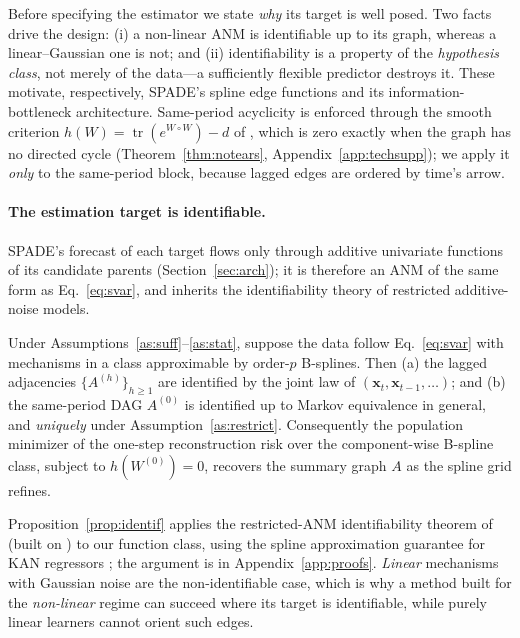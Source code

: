 Before specifying the estimator we state \emph{why} its target is well posed.
Two facts drive the design: (i) a non-linear ANM is identifiable up to its
graph, whereas a linear--Gaussian one is not; and (ii) identifiability is a
property of the \emph{hypothesis class}, not merely of the data---a
sufficiently flexible predictor destroys it. These motivate, respectively,
SPADE's spline edge functions and its information-bottleneck architecture. Same-period
acyclicity is enforced through the smooth criterion
$h(W)=\operatorname{tr}(e^{W\circ W})-d$ of \citet{Zheng2018}, which is zero exactly
when the graph has no directed cycle (Theorem~\ref{thm:notears},
Appendix~\ref{app:techsupp}); we apply it \emph{only} to the same-period block,
because lagged edges are ordered by time's arrow.

\paragraph{The estimation target is identifiable.} SPADE's forecast of each
target flows only through additive univariate functions of its candidate parents
(Section~\ref{sec:arch}); it is therefore an ANM of the same form as
Eq.~\eqref{eq:svar}, and inherits the identifiability theory of restricted
additive-noise models.
\begin{proposition}\label{prop:identif}
Under Assumptions~\ref{as:suff}--\ref{as:stat}, suppose the data follow
Eq.~\eqref{eq:svar} with mechanisms in a class approximable by order-$p$
B-splines. Then (a) the lagged adjacencies $\{A^{(h)}\}_{h\ge 1}$ are identified
by the joint law of $(\mathbf{x}_t,\mathbf{x}_{t-1},\dots)$; and (b) the
same-period DAG $A^{(0)}$ is identified up to Markov equivalence in general,
and \emph{uniquely} under Assumption~\ref{as:restrict}. Consequently the
population minimizer of the one-step reconstruction risk over the component-wise
B-spline class, subject to $h(W^{(0)})=0$, recovers the summary graph $A$ as the
spline grid refines.
\end{proposition}
Proposition~\ref{prop:identif} applies the restricted-ANM identifiability theorem of
\citet[Thm.~31]{peters2014causal} (built on \citealt{hoyer2008nonlinear}) to our
function class, using the spline approximation guarantee for KAN regressors
\citep{Liu2024,liu2025kanconvergence}; the argument is in
Appendix~\ref{app:proofs}. \emph{Linear} mechanisms with Gaussian noise are the
non-identifiable case, which is why a method built for the \emph{non-linear}
regime can succeed where its target is identifiable, while purely linear learners
cannot orient such edges.

